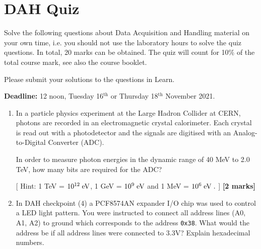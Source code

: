 \chapter{DAH Quiz}
\label{sec:quiz}

Solve the following questions about Data Acquisition and Handling material on your own time,
i.e. you should not use the laboratory hours to solve the quiz questions. 
In total, 20 marks can be obtained.
The quiz will count for 10\% of the total course mark, see also the course booklet.

Please submit your solutions to the questions in Learn.

{\bf Deadline:} 12 noon, Tuesday 16$^\mathrm{th}$ or Thursday 18$^\mathrm{th}$ November 2021.

\begin{enumerate}

\item In a particle physics experiment at the Large Hadron Collider at CERN, photons are recorded in an electromagnetic crystal calorimeter.
Each crystal is read out with a photodetector and the signals are digitised with an Analog-to-Digital Converter (ADC).
%

In order to measure photon energies in the dynamic range of 40 MeV to 2.0 TeV, how many bits are required for the ADC?

[ Hint: 1 TeV = $10^{12}\; \rm eV$, 1 GeV = $10^9\; \rm eV$ and 1 MeV = $10^6\; \rm eV\; .$ ]
%
\hfill {\bf [2 marks]}\\

\item In DAH checkpoint (4) a PCF8574AN expander I/O chip was used to control a LED light pattern.
You were instructed to connect all address lines (A0, A1, A2) to ground which corresponds to the address {\tt 0x38}.
What would the address be if all address lines were connected to 3.3V?
Explain hexadecimal numbers. 


\end{enumerate}
